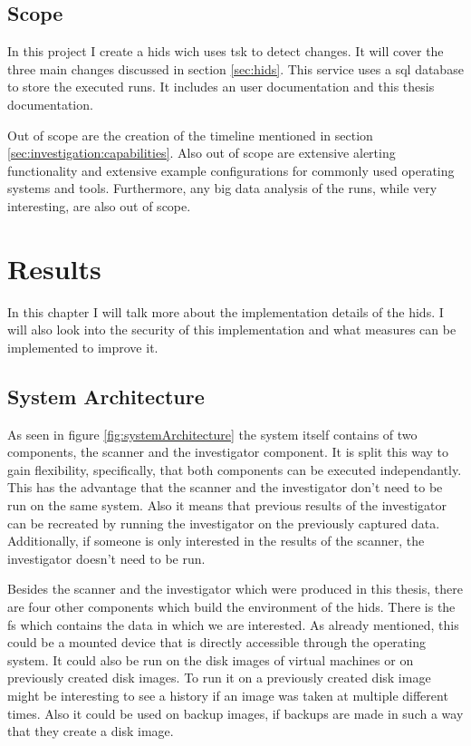 \documentclass[
	a4paper,					%
	10pt,							%
	twoside,					%
	openright,				%
	notitlepage,			%
	parskip=half,			%
]{scrreprt}					%
\begin{document}
\section{Scope}

In this project I create a \gls{hids} wich uses \gls{tsk} to detect changes. It will cover the three main changes discussed in section \ref{sec:hids}. This service uses a \gls{sql} database to store the executed runs. It includes an user documentation and this thesis documentation. 

Out of scope are the creation of the timeline mentioned in section \ref{sec:investigation:capabilities}. Also out of scope are extensive alerting functionality and extensive example configurations for commonly used operating systems and tools. Furthermore, any big data analysis of the runs, while very interesting, are also out of scope.


\chapter{Results}

In this chapter I will talk more about the implementation details of the \gls{hids}. I will also look into the security of this implementation and what measures can be implemented to improve it. 

\section{System Architecture}
\label{sec:Architecture}

As seen in figure \ref{fig:systemArchitecture} the system itself contains of two components, the scanner and the investigator component. It is split this way to gain flexibility, specifically, that both components can be executed independantly. This has the advantage that the scanner and the investigator don't need to be run on the same system. Also it means that previous results of the investigator can be recreated by running the investigator on the previously captured data. Additionally, if someone is only interested in the results of the scanner, the investigator doesn't need to be run.

Besides the scanner and the investigator which were produced in this thesis, there are four other components which build the environment of the \gls{hids}. There is the \gls{fs} which contains the data in which we are interested. As already mentioned, this could be a mounted device that is directly accessible through the operating system. It could also be run on the disk images of virtual machines or on previously created disk images. To run it on a previously created disk image might be interesting to see a history if an image was taken at multiple different times. Also it could be used on backup images, if backups are made in such a way that they create a disk image. 
\end{document}

